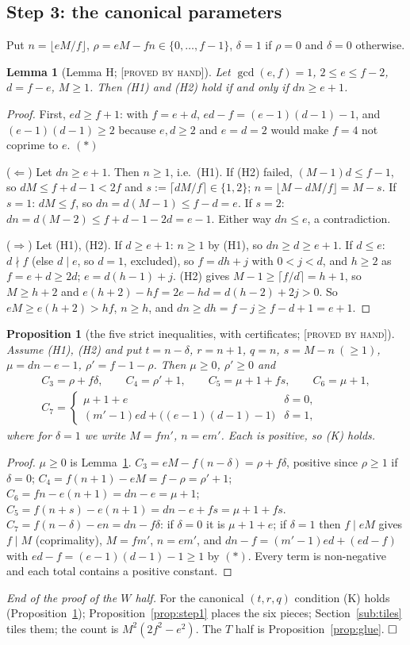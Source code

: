 \documentclass[11pt,reqno]{amsart}
\theoremstyle{plain}
\newtheorem{lemma}[theorem]{Lemma}
\newtheorem{proposition}[theorem]{Proposition}
\theoremstyle{definition}
\newcommand{\lab}[1]{\textup{[\textsc{#1}]}}
\newcommand{\PH}{\lab{proved by hand}}
\begin{document}
\subsection{Step 3: the canonical parameters}\label{sub:lemmaH}
Put $n=\lfloor eM/f\rfloor$, $\rho=eM-fn\in\{0,\dots,f-1\}$, $\delta=1$ if $\rho=0$ and $\delta=0$ otherwise.
\begin{lemma}[Lemma H; \PH{}]\label{lem:H}
Let $\gcd(e,f)=1$, $2\le e\le f-2$, $d=f-e$, $M\ge1$. Then (H1) and (H2) hold if and only if $dn\ge e+1$.
\end{lemma}
\begin{proof}
First, $ed\ge f+1$: with $f=e+d$, $ed-f=(e-1)(d-1)-1$, and $(e-1)(d-1)\ge2$ because $e,d\ge2$ and $e=d=2$ would make $f=4$ not coprime to $e$. $(\ast)$

($\Leftarrow$) Let $dn\ge e+1$. Then $n\ge1$, i.e.\ (H1). If (H2) failed, $(M-1)d\le f-1$, so $dM\le f+d-1<2f$ and $s:=\lceil dM/f\rceil\in\{1,2\}$; $n=\lfloor M-dM/f\rfloor=M-s$. If $s=1$: $dM\le f$, so $dn=d(M-1)\le f-d=e$. If $s=2$: $dn=d(M-2)\le f+d-1-2d=e-1$. Either way $dn\le e$, a contradiction.

($\Rightarrow$) Let (H1), (H2). If $d\ge e+1$: $n\ge1$ by (H1), so $dn\ge d\ge e+1$. If $d\le e$: $d\nmid f$ (else $d\mid e$, so $d=1$, excluded), so $f=dh+j$ with $0<j<d$, and $h\ge2$ as $f=e+d\ge2d$; $e=d(h-1)+j$. (H2) gives $M-1\ge\lceil f/d\rceil=h+1$, so $M\ge h+2$ and $e(h+2)-hf=2e-hd=d(h-2)+2j>0$. So $eM\ge e(h+2)>hf$, $n\ge h$, and $dn\ge dh=f-j\ge f-d+1=e+1$.
\end{proof}
\begin{proposition}[the five strict inequalities, with certificates; \PH{}]\label{prop:cert}
Assume (H1), (H2) and put $t=n-\delta$, $r=n+1$, $q=n$, $s=M-n\ (\ge1)$, $\mu=dn-e-1$, $\rho'=f-1-\rho$. Then $\mu\ge0$, $\rho'\ge0$ and
\begin{gather*}
C_3=\rho+f\delta,\qquad C_4=\rho'+1,\qquad C_5=\mu+1+fs,\qquad C_6=\mu+1,\\
C_7=\begin{cases}\mu+1+e&\delta=0,\\ (m'-1)ed+\bigl((e-1)(d-1)-1\bigr)&\delta=1,\end{cases}
\end{gather*}
where for $\delta=1$ we write $M=fm'$, $n=em'$. Each is positive, so (K) holds.
\end{proposition}
\begin{proof}
$\mu\ge0$ is Lemma~\ref{lem:H}. $C_3=eM-f(n-\delta)=\rho+f\delta$, positive since $\rho\ge1$ if $\delta=0$; $C_4=f(n+1)-eM=f-\rho=\rho'+1$; $C_6=fn-e(n+1)=dn-e=\mu+1$; $C_5=f(n+s)-e(n+1)=dn-e+fs=\mu+1+fs$. $C_7=f(n-\delta)-en=dn-f\delta$: if $\delta=0$ it is $\mu+1+e$; if $\delta=1$ then $f\mid eM$ gives $f\mid M$ (coprimality), $M=fm'$, $n=em'$, and $dn-f=(m'-1)ed+(ed-f)$ with $ed-f=(e-1)(d-1)-1\ge1$ by $(\ast)$. Every term is non-negative and each total contains a positive constant.
\end{proof}
\noindent\emph{End of the proof of the $W$ half.} For the canonical $(t,r,q)$ condition (K) holds (Proposition~\ref{prop:cert}); Proposition~\ref{prop:step1} places the six pieces; Section~\ref{sub:tiles} tiles them; the count is $M^2(2f^2-e^2)$. The $T$ half is Proposition~\ref{prop:glue}. $\hfill\square$
\end{document}
